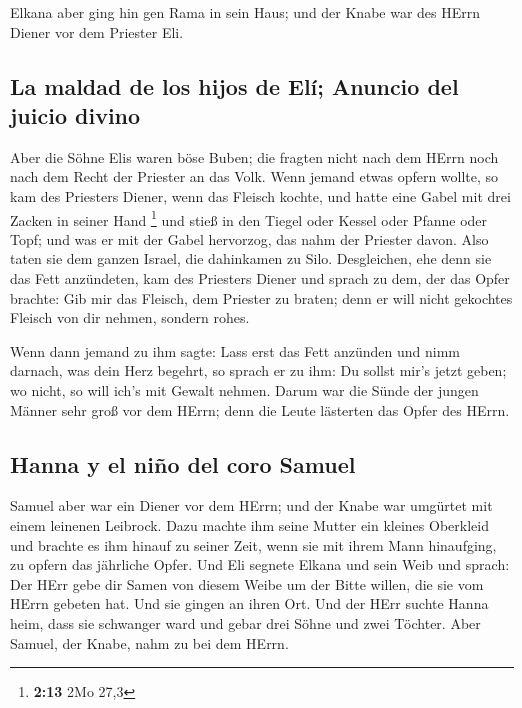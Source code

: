  Elkana aber ging hin gen Rama in sein Haus; und der
Knabe war des HErrn Diener vor dem Priester Eli.

\hypertarget{la-maldad-de-los-hijos-de-eluxed-anuncio-del-juicio-divino}{%
\subsection{La maldad de los hijos de Elí; Anuncio del juicio
divino}\label{la-maldad-de-los-hijos-de-eluxed-anuncio-del-juicio-divino}}

 Aber die Söhne Elis waren böse Buben; die fragten nicht
nach dem HErrn  noch nach dem Recht der Priester an das
Volk. Wenn jemand etwas opfern wollte, so kam des Priesters Diener, wenn
das Fleisch kochte, und hatte eine Gabel mit drei Zacken in seiner Hand
\footnote{\textbf{2:13} 2Mo 27,3}  und stieß in den
Tiegel oder Kessel oder Pfanne oder Topf; und was er mit der Gabel
hervorzog, das nahm der Priester davon. Also taten sie dem ganzen
Israel, die dahinkamen zu Silo.  Desgleichen, ehe denn
sie das Fett anzündeten, kam des Priesters Diener und sprach zu dem, der
das Opfer brachte: Gib mir das Fleisch, dem Priester zu braten; denn er
will nicht gekochtes Fleisch von dir nehmen, sondern rohes.

 Wenn dann jemand zu ihm sagte: Lass erst das Fett
anzünden und nimm darnach, was dein Herz begehrt, so sprach er zu ihm:
Du sollst mir's jetzt geben; wo nicht, so will ich's mit Gewalt nehmen.
 Darum war die Sünde der jungen Männer sehr groß vor dem
HErrn; denn die Leute lästerten das Opfer des HErrn.

\hypertarget{hanna-y-el-niuxf1o-del-coro-samuel}{%
\subsection{Hanna y el niño del coro
Samuel}\label{hanna-y-el-niuxf1o-del-coro-samuel}}

 Samuel aber war ein Diener vor dem HErrn; und der Knabe
war umgürtet mit einem leinenen Leibrock.  Dazu machte
ihm seine Mutter ein kleines Oberkleid und brachte es ihm hinauf zu
seiner Zeit, wenn sie mit ihrem Mann hinaufging, zu opfern das jährliche
Opfer.  Und Eli segnete Elkana und sein Weib und sprach:
Der HErr gebe dir Samen von diesem Weibe um der Bitte willen, die sie
vom HErrn gebeten hat. Und sie gingen an ihren Ort.  Und
der HErr suchte Hanna heim, dass sie schwanger ward und gebar drei Söhne
und zwei Töchter. Aber Samuel, der Knabe, nahm zu bei dem HErrn.

